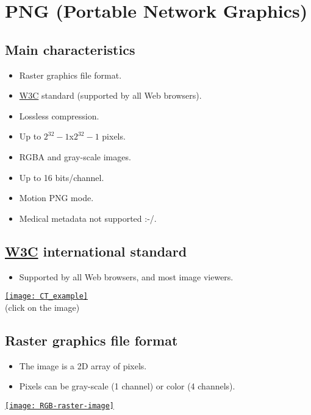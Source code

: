 \chapter{PNG (Portable Network Graphics)}

\section{Main characteristics}
\begin{itemize}
\item Raster graphics file format.
\item \href{https://www.w3.org/}{W3C} standard (supported by all Web browsers).
\item Lossless compression.
\item Up to $2^{32}-1$x$2^{32}-1$ pixels.
\item RGBA and gray-scale images.
\item Up to 16 bits/channel.
\item Motion PNG mode.
\item Medical metadata not supported :-/.
\end{itemize}

\section{\href{https://www.w3.org/}{W3C} international standard}
\begin{itemize}
\item Supported by all Web browsers, and most image viewers.
\end{itemize}
\begin{center}
  \href{https://upload.wikimedia.org/wikipedia/commons/0/05/CT_of_a_normal_abdomen_and_pelvis%2C_coronal_plane_79.png}{\texttt{[image: CT\_example]}}\\
     (click on the image)
\end{center}

\section{Raster graphics file format}
\begin{itemize}
\item The image is a 2D array of pixels.
\item Pixels can be gray-scale (1 channel) or color  (4 channels).
\end{itemize}
\begin{center}
  \href{https://en.wikipedia.org/wiki/Raster_graphics}{\texttt{[image: RGB-raster-image]}}
\end{center}

